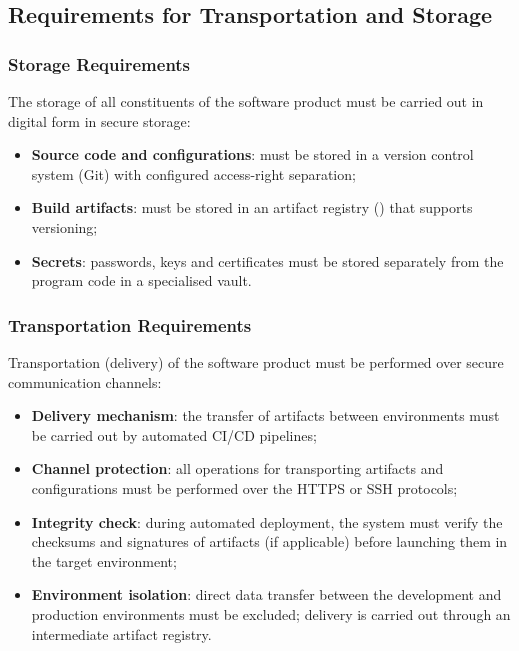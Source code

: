 \documentclass[12pt,a4paper]{extarticle}
\begin{document}
\subsection{Requirements for Transportation and Storage}

\subsubsection{Storage Requirements}

\begin{hseExample}
The storage of all constituents of the software product must be carried out in digital form in secure storage:
\begin{itemize}[nosep, leftmargin=1.25cm]
    \item \textbf{Source code and configurations}: must be stored in a version control system (Git) with configured access-right separation;
    \item \textbf{Build artifacts}: must be stored in an artifact registry () that supports versioning;
    \item \textbf{Secrets}: passwords, keys and certificates must be stored separately from the program code in a specialised vault.
\end{itemize}
\end{hseExample}

\subsubsection{Transportation Requirements}

\begin{hseExample}
Transportation (delivery) of the software product must be performed over secure communication channels:
\begin{itemize}[nosep, leftmargin=1.25cm]
    \item \textbf{Delivery mechanism}: the transfer of artifacts between environments must be carried out by automated CI/CD pipelines;
    \item \textbf{Channel protection}: all operations for transporting artifacts and configurations must be performed over the HTTPS or SSH protocols;
    \item \textbf{Integrity check}: during automated deployment, the system must verify the checksums and signatures of artifacts (if applicable) before launching them in the target environment;
    \item \textbf{Environment isolation}: direct data transfer between the development and production environments must be excluded; delivery is carried out through an intermediate artifact registry.
\end{itemize}
\end{hseExample}
\end{document}
